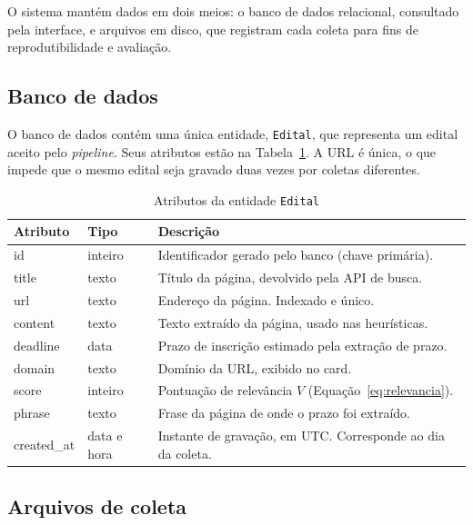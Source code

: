 O sistema mantém dados em dois meios: o banco de dados relacional, consultado
pela interface, e arquivos em disco, que registram cada coleta para fins de
reprodutibilidade e avaliação.

\subsection{Banco de dados}

O banco de dados contém uma única entidade, \texttt{Edital}, que representa um
edital aceito pelo \textit{pipeline}. Seus atributos estão na
Tabela~\ref{tab:entidade_edital}. A URL é única, o que impede que o mesmo
edital seja gravado duas vezes por coletas diferentes.

\begin{table}[htbp]
\centering
\caption{Atributos da entidade \texttt{Edital}}
\label{tab:entidade_edital}
\small
\begin{tabularx}{\textwidth}{>{\ttfamily}l l X}
\toprule
\normalfont Atributo & Tipo & Descrição \\
\midrule
id         & inteiro        & Identificador gerado pelo banco (chave primária). \\
title      & texto          & Título da página, devolvido pela API de busca. \\
url        & texto          & Endereço da página. Indexado e único. \\
content    & texto          & Texto extraído da página, usado nas heurísticas. \\
deadline   & data           & Prazo de inscrição estimado pela extração de prazo. \\
domain     & texto          & Domínio da URL, exibido no card. \\
score      & inteiro        & Pontuação de relevância $V$ (Equação~\ref{eq:relevancia}). \\
phrase     & texto          & Frase da página de onde o prazo foi extraído. \\
created\_at & data e hora   & Instante de gravação, em UTC. Corresponde ao dia da coleta. \\
\bottomrule
\end{tabularx}
\end{table}

\subsection{Arquivos de coleta}

